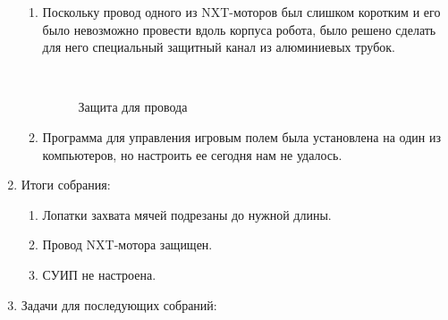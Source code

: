 \begin{enumerate}
\begin{enumerate}
		\item Поскольку провод одного из NXT-моторов был слишком коротким и его было невозможно провести вдоль корпуса робота, было решено сделать для него специальный защитный канал из алюминиевых трубок.
		\begin{figure}[H]
			\begin{minipage}[h]{0.2\linewidth}
				\center  
			\end{minipage}
			\begin{minipage}[h]{0.6\linewidth}
				\caption{Защита для провода}
			\end{minipage}
		\end{figure}
		
        \item Программа для управления игровым полем была установлена на один из компьютеров, но настроить ее сегодня нам не удалось.

	\end{enumerate}
	
	\item Итоги собрания:
	\begin{enumerate}
		
		\item Лопатки захвата мячей подрезаны до нужной длины.
		
		\item Провод NXT-мотора защищен.
		
        \item СУИП не настроена.
		
	\end{enumerate}
	
	\item Задачи для последующих собраний:
	\begin{enumerate}
		

\end{enumerate}
\end{enumerate}
